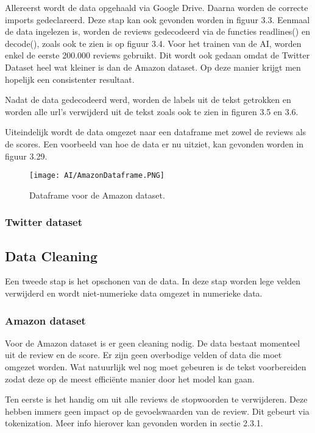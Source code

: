 Allereerst wordt de data opgehaald via Google Drive. Daarna worden de correcte imports gedeclareerd. Deze stap kan ook gevonden worden in figuur 3.3. Eenmaal de data ingelezen is, worden de reviews gedecodeerd via de functies readlines() en decode(), zoals ook te zien is op figuur 3.4. Voor het trainen van de AI, worden enkel de eerste 200.000 reviews gebruikt. Dit wordt ook gedaan omdat de Twitter Dataset heel wat kleiner is dan de Amazon dataset. Op deze manier krijgt men hopelijk een consistenter resultaat. 

Nadat de data gedecodeerd werd, worden de labels uit de tekst getrokken en worden alle url's verwijderd uit de tekst zoals ook te zien in figuren 3.5 en 3.6. 

Uiteindelijk wordt de data omgezet naar een dataframe met zowel de reviews als de scores. Een voorbeeld van hoe de data er nu uitziet, kan gevonden worden in figuur 3.29.

\begin{figure}[!htbp]
    \texttt{[image: AI/AmazonDataframe.PNG]}
    \caption{\label{amazondataframe}Dataframe voor de Amazon dataset.}
\end{figure}
\FloatBarrier 

\subsubsection{Twitter dataset}

\subsection{Data Cleaning}
\label{proofofconceptdatacleaning}
Een tweede stap is het opschonen van de data. In deze stap worden lege velden verwijderd en wordt niet-numerieke data omgezet in numerieke data.

\subsubsection{Amazon dataset}
Voor de Amazon dataset is er geen cleaning nodig. De data bestaat momenteel uit de review en de score. Er zijn geen overbodige velden of data die moet omgezet worden. Wat natuurlijk wel nog moet gebeuren is de tekst voorbereiden zodat deze op de meest efficiënte manier door het model kan gaan.

Ten eerste is het handig om uit alle reviews de stopwoorden te verwijderen. Deze hebben immers geen impact op de gevoelswaarden van de review. Dit gebeurt via tokenization. Meer info hierover kan gevonden worden in sectie 2.3.1.

